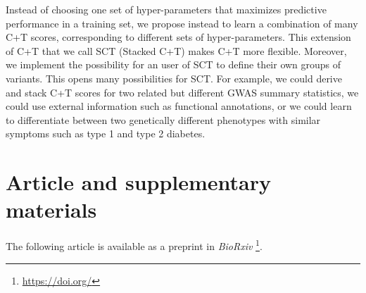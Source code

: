 Instead of choosing one set of hyper-parameters that maximizes predictive performance in a training set, we propose instead to learn a combination of many C+T scores, corresponding to different sets of hyper-parameters.
This extension of C+T that we call SCT (Stacked C+T) makes C+T more flexible.
Moreover, we implement the possibility for an user of SCT to define their own groups of variants. This opens many possibilities for SCT. For example, we could derive and stack C+T scores for two related but different GWAS summary statistics, we could use external information such as functional annotations, or we could learn to differentiate between two genetically different phenotypes with similar symptoms such as type 1 and type 2 diabetes.




\section{Article and supplementary materials}

The following article is available as a preprint in \textit{BioRxiv}	\footnote{\url{https://doi.org/}}.
